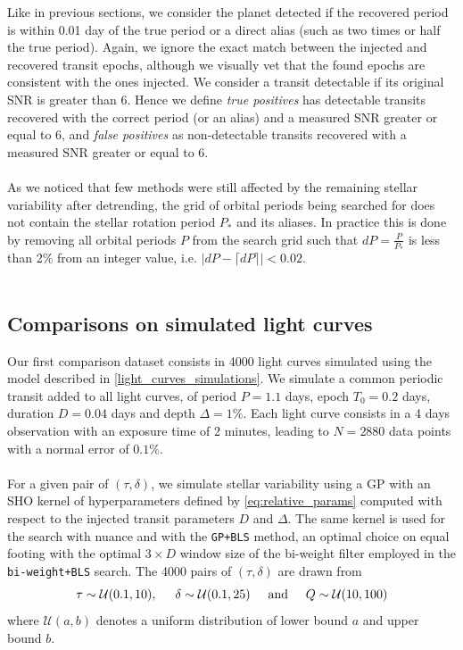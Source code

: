 \documentclass[modern]{aastex631}
\newcommand{\wtls}{\texttt{bi-weight+BLS}}
\begin{document}
Like in previous sections, we consider the planet detected if the recovered period is within 0.01 day of the true period or a direct alias (such as two times or half the true period). Again, we ignore the exact match between the injected and recovered transit epochs, although we visually vet that the found epochs are consistent with the ones injected. We consider a transit detectable if its original SNR is greater than 6. Hence we define \textit{true positives} has detectable transits recovered with the correct period (or an alias) and a measured SNR greater or equal to 6, and \textit{false positives} as non-detectable transits recovered with a measured SNR greater or equal to 6.\\\\As we noticed that few methods were still affected by the remaining stellar variability after detrending, the grid of orbital periods being searched for does not contain the stellar rotation period $P_*$ and its aliases. In practice this is done by removing all orbital periods $P$ from the search grid such that $dP = \frac{P}{P_*}$ is less than 2\% from an integer value, i.e. $\vert  dP - \lceil dP \rceil \vert < 0.02$.\\\\
\subsection{Comparisons on simulated light curves}\label{simu}
Our first comparison dataset consists in 4000 light curves simulated using the model described in \autoref{light_curves_simulations}. We simulate a common periodic transit added to all light curves, of period $P=1.1$ days, epoch $T_0=0.2$ days, duration $D=0.04$ days and depth $\Delta=1\%$. Each light curve consists in a 4 days observation with an exposure time of 2 minutes, leading to $N=2880$ data points with a normal error of $0.1\%$.\\\\
For a given pair of $(\tau, \delta)$, we simulate stellar variability using a GP with an SHO kernel of hyperparameters defined by \autoref{eq:relative_params} computed with respect to the injected transit parameters $D$ and $\Delta$. The same kernel is used for the search with \textsf{nuance} and with the \texttt{GP+BLS} method, an optimal choice on equal footing with the optimal $3\times D$ window size of the bi-weight filter employed in the \wtls{} search.
The 4000 pairs of $(\tau, \delta)$ are drawn from
\begin{equation*}
    \tau \sim \mathcal{U}(0.1, 10), \hspace{0.5cm} \delta \sim \mathcal{U}(0.1, 25) \hspace{0.5cm}\text{and}\hspace{0.5cm} Q \sim \mathcal{U}(10, 100)
\end{equation*}
where $\mathcal{U}(a, b)$ denotes a uniform distribution of lower bound $a$ and upper bound $b$.\\\\
\end{document}
